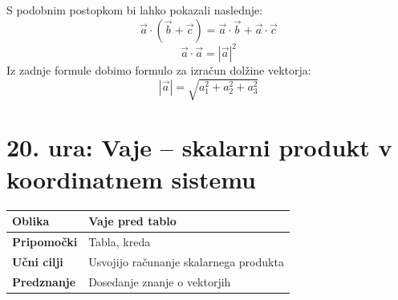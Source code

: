 \documentclass[a4paper,11pt]{article}
\begin{document}
S podobnim postopkom bi lahko pokazali naslednje:
$$\vec{a}\cdot (\vec{b}+\vec{c})=\vec{a}\cdot \vec{b}+\vec{a}\cdot\vec{c}$$
$$\vec{a}\cdot\vec{a}= |\vec{a}|^2$$
Iz zadnje formule dobimo formulo za izračun dolžine vektorja: 
$$|\vec{a}|=\sqrt{a_1^2+a_2^2+a_3^2}$$
\newpage
\section{20. ura: Vaje -- skalarni produkt v koordinatnem sistemu}
\begin{tabularx}{\textwidth}{|>{\bfseries\RaggedRight}p{2.7cm}|X|}
\hline
Oblika & Vaje pred tablo \\ \hline
Pripomočki & Tabla, kreda \\ \hline
Učni cilji & Usvojijo računanje skalarnega produkta \\ \hline
Predznanje & Dosedanje znanje o vektorjih \\ \hline

\end{tabularx}
\\
\end{document}

